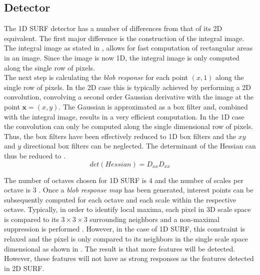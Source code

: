 \subsection{Detector}
\label{sec:1dsurfDetect}
The 1D SURF detector has a number of differences from that of its 2D equivalent. The first major difference is the construction of the integral image. The integral image as stated in , allows for fast computation of rectangular areas in an image. Since the image is now 1D, the integral image is only computed along the single row of pixels.\\ 

The next step is calculating the \textit{blob response} for each point $(x,1)$ along the single row of pixels. In the 2D case this is typically achieved by performing a 2D convolution, convolving a second order Gaussian derivative with the image at the point $\textbf{x} = (x,y)$. The Gaussian is approximated as a box filter and, combined with the integral image, results in a very efficient computation. In the 1D case the convolution can only be computed along the single dimensional row of pixels. Thus, the box filters have been effectively reduced to 1D box filters and the $xy$ and $y$ directional box filters can be neglected. The determinant of the Hessian can thus be reduced to  \cite{Anderson}.\\

\begin{equation}
det(Hessian) = D_{xx}D_{xx}
\label{eqn:reducedHessian}
\end{equation} 

The number of octaves chosen for 1D SURF is $4$ and the number of scales per octave is $3$ \cite{Anderson}. Once a \textit{blob response map} has been generated, interest points can be subsequently computed for each octave and each scale within the respective octave. Typically, in order to identify local maxima, each pixel in 3D scale space is compared to its $3 \times 3 \times 3$ surrounding neighbors and a non-maximal suppression is performed \citep{Evans2009}. However, in the case of 1D SURF, this constraint is relaxed and the pixel is only compared to its neighbors in the single scale space dimensional as shown in . The result is that more features will be detected. However, these features will not have as strong responses as the features detected in 2D SURF.\\

